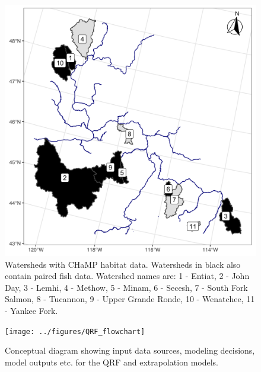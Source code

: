 \documentclass[
  12pt,
]{article}
\begin{document}
\hypertarget{figures}{}

\begin{figure}
\includegraphics[width=0.9\linewidth]{../figures/ChampWtds} \caption{Watersheds with CHaMP habitat data. Watersheds in black also contain paired fish data. Watershed names are: 1 - Entiat, 2 - John Day, 3 - Lemhi, 4 - Methow, 5 - Minam, 6 - Secesh, 7 - South Fork Salmon, 8 - Tucannon, 9 - Upper Grande Ronde, 10 - Wenatchee, 11 - Yankee Fork.}\label{fig:wtsd-map}
\end{figure}

\newpage

\begin{figure}
\texttt{[image: ../figures/QRF\_flowchart]} \caption{Conceptual diagram showing input data sources, modeling decisions, model outputs etc. for the QRF and extrapolation models.}\label{fig:model-diag}
\end{figure}

\newpage
\end{document}
